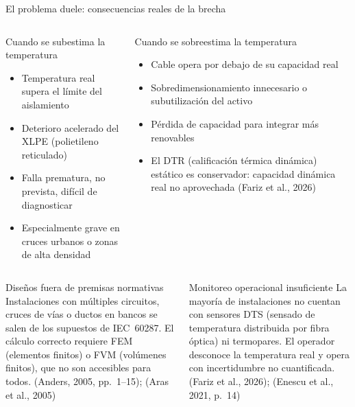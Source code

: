 \documentclass[aspectratio=169]{beamer}
\newcommand{\refcite}[1]{{\footnotesize\color{gray!70!black} #1}}
\begin{document}
\begin{frame}{El problema duele: consecuencias reales de la brecha}
\begin{columns}[T]
\begin{alertblock}{Cuando se subestima la temperatura}
\scriptsize
\begin{itemize}[leftmargin=*,itemsep=1pt]
    \item Temperatura real supera el límite del aislamiento
    \item Deterioro acelerado del XLPE (polietileno reticulado)
    \item Falla prematura, no prevista, difícil de diagnosticar
    \item Especialmente grave en cruces urbanos o zonas de alta densidad
\end{itemize}
\end{alertblock}
\begin{exampleblock}{Cuando se sobreestima la temperatura}
\scriptsize
\begin{itemize}[leftmargin=*,itemsep=1pt]
    \item Cable opera por debajo de su capacidad real
    \item Sobredimensionamiento innecesario o subutilización del activo
    \item Pérdida de capacidad para integrar más renovables
    \item El DTR (calificación térmica dinámica) estático es conservador:
          capacidad dinámica real no aprovechada \refcite{(Fariz et al., 2026)}
\end{itemize}
\end{exampleblock}
\end{columns}

\vspace{0.2em}
\begin{columns}[T]
\begin{block}{Diseños fuera de premisas normativas}
\scriptsize
Instalaciones con múltiples circuitos, cruces de vías o ductos en bancos se
salen de los supuestos de IEC~60287. El cálculo correcto requiere
FEM (elementos finitos) o FVM (volúmenes finitos), que no son accesibles para todos.
\refcite{(Anders, 2005, pp.~1--15); (Aras et al., 2005)}
\end{block}
\begin{block}{Monitoreo operacional insuficiente}
\scriptsize
La mayoría de instalaciones no cuentan con sensores DTS (sensado de
temperatura distribuida por fibra óptica) ni termopares. El operador
desconoce la temperatura real y opera con incertidumbre no cuantificada.
\refcite{(Fariz et al., 2026); (Enescu et al., 2021, p.~14)}
\end{block}
\end{columns}
\end{frame}
\end{document}
